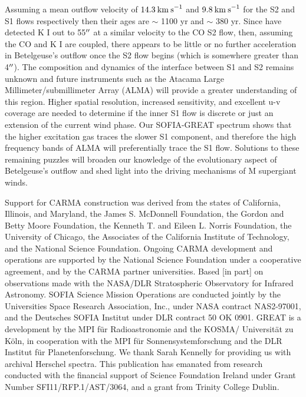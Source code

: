 \documentclass[iop]{emulateapj}
\begin{document}
Assuming a mean outflow velocity of $14.3\>{\rm km\>s}^{-1}$ and $9.8\>{\rm km\>s}^{-1}$ for the S2 and S1 flows respectively then their ages are $\sim$ 1100 yr and $\sim$ 380 yr. Since \cite{2002A&A...386.1009P} have detected K I out to 55$\mbox{$^{\prime\prime}$}$ at a similar velocity to the CO S2 flow, then, assuming the CO and K I are coupled, there appears to be little or no further acceleration in Betelgeuse's outflow once the S2 flow begins (which is somewhere greater than 4$\mbox{$^{\prime\prime}$}$). The composition and dynamics of the interface between S1 and S2 remains unknown and future instruments such as the Atacama Large Millimeter/submillimeter Array (ALMA) will provide a greater understanding of this region. Higher spatial resolution, increased sensitivity, and excellent u-v coverage are needed to determine if the inner S1 flow is discrete or just an extension of the current wind phase. Our SOFIA-GREAT spectrum shows that the higher excitation gas traces the slower S1 component, and therefore the high frequency bands of ALMA will preferentially trace the S1 flow. Solutions to these remaining puzzles will broaden our knowledge of the evolutionary aspect of Betelgeuse's outflow and shed light into the driving mechanisms of M supergiant winds.

\acknowledgments

Support for CARMA construction was derived from the states of California, Illinois, and
Maryland, the James S. McDonnell Foundation, the Gordon and Betty Moore Foundation, the
Kenneth T. and Eileen L. Norris Foundation, the University of Chicago, the Associates of the
California Institute of Technology, and the National Science Foundation. Ongoing CARMA
development and operations are supported by the National Science Foundation under a
cooperative agreement, and by the CARMA partner universities. Based [in part] on observations made with the NASA/DLR Stratospheric Observatory for Infrared Astronomy. SOFIA Science Mission Operations are conducted jointly by the Universities Space Research Association, Inc., under NASA contract NAS2-97001, and the Deutsches SOFIA Institut under DLR contract 50 OK 0901. GREAT is a development by the MPI f\"ur Radioastronomie and the KOSMA/ Universit\"at zu K\"oln, in cooperation with the MPI f\"ur Sonnensystemforschung and the DLR Institut f\"ur Planetenforschung. We thank Sarah Kennelly for providing us with archival Herschel spectra. This publication has emanated from research conducted with the financial support of Science Foundation Ireland under Grant Number SFI11/RFP.1/AST/3064, and a grant from Trinity College Dublin.
\end{document}
